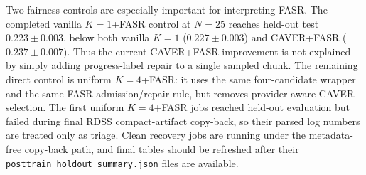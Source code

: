 \documentclass[10pt]{article}
\theoremstyle{plain}
\theoremstyle{definition}
\theoremstyle{remark}
\begin{document}
Two fairness controls are especially important for interpreting FASR. The completed vanilla $K=1$+FASR control at $N=25$ reaches held-out test $0.223\pm0.003$, below both vanilla $K=1$ ($0.227\pm0.003$) and CAVER+FASR ($0.237\pm0.007$). Thus the current CAVER+FASR improvement is not explained by simply adding progress-label repair to a single sampled chunk. The remaining direct control is uniform $K=4$+FASR: it uses the same four-candidate wrapper and the same FASR admission/repair rule, but removes provider-aware CAVER selection. The first uniform $K=4$+FASR jobs reached held-out evaluation but failed during final RDSS compact-artifact copy-back, so their parsed log numbers are treated only as triage. Clean recovery jobs are running under the metadata-free copy-back path, and final tables should be refreshed after their \texttt{posttrain\_holdout\_summary.json} files are available.
\end{document}
